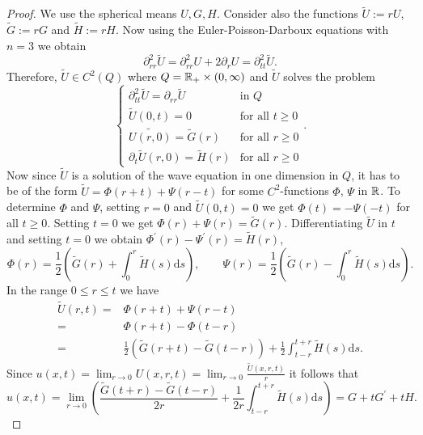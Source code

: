 \documentclass[11pt]{article}
\begin{document}
				\begin{proof}
					We use the spherical means $U,G,H$. Consider also the functions $\tilde{U}:=rU$, $\tilde{G}:=rG$ and $\tilde{H}:=rH$. Now using the Euler-Poisson-Darboux equations with $n=3$ we obtain
					\begin{equation*}
						\partial_{rr}^2\tilde{U}=\partial_{rr}^2U+2\partial_rU=\partial_{tt}^2\tilde{U}.
					\end{equation*}
					Therefore, $\tilde{U}\in C^2(Q)$ where $Q=\mathbb{R}_+\times(0,\infty)$ and $\tilde{U}$ solves the problem 
					\begin{equation*}
						\begin{cases}
							\partial_{tt}^2\tilde{U}=\partial_{rr}\tilde{U} & \text{in }Q\\
							\tilde{U}(0,t)=0 & \text{for all }t\ge0\\
							\tilde{U(r,0)}=\tilde{G}(r) & \text{for all }r\ge0\\
							\partial_t\tilde{U}(r,0)=\tilde{H}(r) & \text{for all }r\ge0
						\end{cases}.
					\end{equation*}
					Now since $\tilde{U}$ is a solution of the wave equation in one dimension in $Q$, it has to be of the form
					$\tilde{U}=\Phi(r+t)+\Psi(r-t)$ for some $C^2$-functions $\Phi$, $\Psi$ in $\mathbb{R}$. To determine $\Phi$ and $\Psi$, setting $r=0$ and $\tilde{U}(0,t)=0$ we get $\Phi(t)=-\Psi(-t)$ for all $t\ge0$. Setting $t=0$ we get $\Phi(r)+\Psi(r)=\tilde{G}(r)$. Differentiating $\tilde{U}$ in $t$ and setting $t=0$ we obtain $\Phi^\prime(r)-\Psi^\prime(r)=\tilde{H}(r)$,
					\begin{equation*}
						\Phi(r)=\frac{1}{2}\left(\tilde{G}(r)+\int_0^r\tilde{H}(s)\mathrm{d}s\right),\qquad \Psi(r)=\frac{1}{2}\left(\tilde{G}(r)-\int_0^r\tilde{H}(s)\mathrm{d}s\right).
					\end{equation*}
					In the range $0\le r\le t$ we have
					\begin{align*}
						\tilde{U}(r,t)=&\Phi(r+t)+\Psi(r-t)\\
						=&\Phi(r+t)-\Phi(t-r)\\
						=&\frac{1}{2}\left(\tilde{G}(r+t)-\tilde{G}(t-r)\right)+\frac{1}{2}\int_{t-r}^{t+r}\tilde{H}(s)\mathrm{d}s.
					\end{align*}
					Since
					$u(x,t)=\lim_{r\to0}U(x,r,t)=\lim_{r\to0}\frac{\tilde{U}(x,r,t)}{r}$ it follows that
					\begin{equation*}
						u(x,t)=\lim_{r\to0}\left(\frac{\tilde{G}(t+r)-\tilde{G}(t-r)}{2r}+\frac{1}{2r}\int_{t-r}^{t+r}\tilde{H}(s)\mathrm{d}s\right)=G+tG^\prime+tH.

\end{equation*}
\end{proof}
\end{document}
